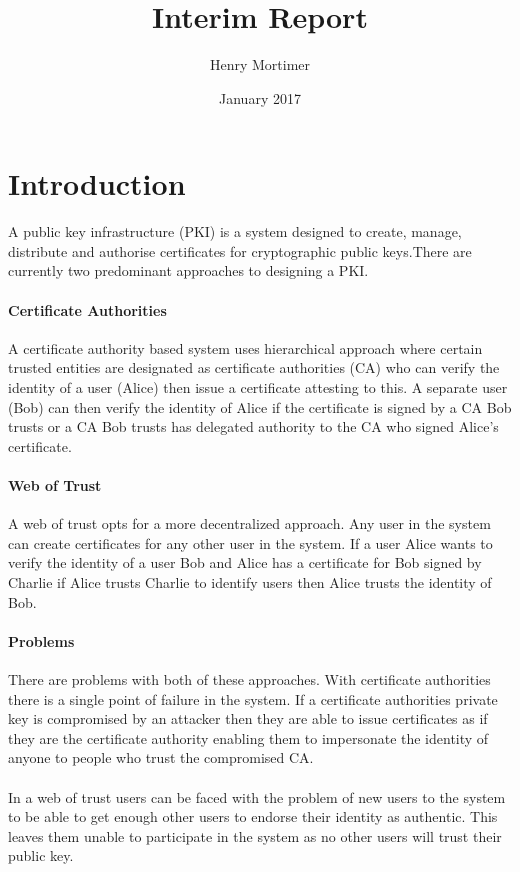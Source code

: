 \documentclass[10pt, a4paper]{article}
\begin{document}
\title{Interim Report}
\author{Henry Mortimer}
\date{January 2017}
\maketitle

\section{Introduction}
A public key infrastructure (PKI) is a system designed to create, manage, distribute and authorise certificates for cryptographic public keys.\@ There are currently two predominant approaches to designing a PKI.

\paragraph{Certificate Authorities}
A certificate authority based system uses hierarchical approach where certain trusted entities are designated as certificate authorities (CA) who can verify the identity of a user (Alice) then issue a certificate attesting to this. A separate user (Bob) can then verify the identity of Alice if the certificate is signed by a CA Bob trusts or a CA Bob trusts has delegated authority to the CA who signed Alice's certificate. 

\paragraph{Web of Trust}
A web of trust opts for a more decentralized approach. Any user in the system can create certificates for any other user in the system. If a user Alice wants to verify the identity of a user Bob and Alice has a certificate for Bob signed by Charlie if Alice trusts Charlie to identify users then Alice trusts the identity of Bob.

\paragraph{Problems}
There are problems with both of these approaches. With certificate authorities there is a single point of failure in the system. If a certificate authorities private key is compromised by an attacker then they are able to issue certificates as if they are the certificate authority enabling them to impersonate the identity of anyone to people who trust the compromised CA.

\paragraph{} 
In a web of trust users can be faced with the problem of new users to the system to be able to get enough other users to endorse their identity as authentic. This leaves them unable to participate in the system as no other users will trust their public key. 
\end{document}
